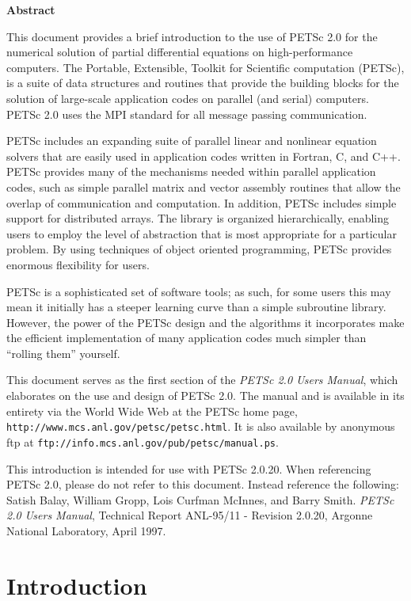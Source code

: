 \vspace{1.0cm}

\begin{center} {\bf Abstract} \end{center}

This document provides a brief introduction to
the use of PETSc 2.0 for the numerical solution
of partial differential equations on high-performance computers.  The
Portable, Extensible, Toolkit for Scientific computation (PETSc), is a
suite of data structures and routines that provide the building
blocks for the solution of large-scale application codes on parallel
(and serial) computers.  PETSc 2.0 uses the MPI standard for all
message passing communication.

PETSc includes an expanding suite of parallel linear and nonlinear
equation solvers that are easily used in application codes written in
Fortran, C, and C++.  PETSc provides many of the mechanisms needed
within parallel application codes, such as simple parallel matrix and
vector assembly routines that allow the overlap of communication and
computation.  In addition, PETSc includes simple support for
distributed arrays.  The library is organized
hierarchically, enabling users to employ the level of abstraction that
is most appropriate for a particular problem. By using techniques 
of object oriented programming, PETSc provides enormous flexibility 
for users.

PETSc is a sophisticated set of software tools; as such, for some
users this may mean it initially has a steeper learning curve than a
simple subroutine library. However, the power of the PETSc design and
the algorithms it incorporates make the efficient implementation of
many application codes much simpler than ``rolling them'' yourself.

This document serves as the first section of the {\em PETSc 2.0 Users
Manual}, which elaborates on the use and design of PETSc 2.0. The
manual and is available in its entirety via the World Wide Web at
the PETSc home page, {\tt http://www.mcs.anl.gov/petsc/petsc.html}.
It is also available
by anonymous ftp at {\tt ftp://info.mcs.anl.gov/pub/petsc/manual.ps}.

\vspace{1.2cm}

 This introduction is intended for use with
PETSc 2.0.20. When referencing PETSc 2.0, please do 
not refer to this document. Instead reference the following: Satish
Balay, William Gropp, Lois Curfman McInnes, and Barry Smith.  {\em
PETSc 2.0 Users Manual}, Technical Report ANL-95/11 - Revision 2.0.20,
Argonne National Laboratory, April 1997.

%
\newpage


\newpage
\section{Introduction}


